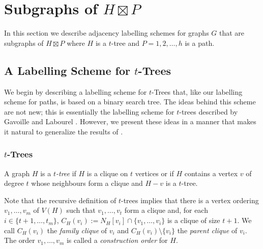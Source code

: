 \documentclass[kpfonts]{patmorin}
\begin{document}
\section{Subgraphs of $H\boxtimes P$}

In this section we describe adjacency labelling schemes for graphs $G$ that are subgraphs of $H\boxtimes P$ where $H$ is a $t$-tree and $P=1,2,\ldots,h$ is a path.  


\subsection{A Labelling Scheme for $t$-Trees}

We begin by describing a labelling scheme for $t$-Trees that, like our labelling scheme for paths, is based on a binary search tree.  The ideas behind this scheme are not new; this is essentially the labelling scheme for $t$-trees described by Gavoille and Labourel \cite{gavoille.labourel:shorter}.  However, we present these ideas in a manner that makes it natural to generalize the results of .

\subsubsection{$t$-Trees}

A graph $H$ is a \emph{$t$-tree} if $H$ is a clique on $t$ vertices or if $H$ contains a vertex $v$ of degree $t$ whose neighbours form a clique and $H-v$ is a $t$-tree.  

Note that the recursive definition of $t$-trees implies that there is a vertex ordering $v_1,\ldots,v_{m}$ of $V(H)$ such that $v_1,\ldots,v_t$ form a clique and, for each $i\in\{t+1,\ldots,t_m\}$, $C_H(v_i):=N_H[v_i]\cap \{v_1,\ldots,v_{i}\}$ is a clique of size $t+1$.  We call $C_H(v_i)$ the \emph{family clique} of $v_i$ and $C_H(v_i)\setminus\{v_i\}$ the \emph{parent clique} of $v_i$.  The order $v_1,\ldots,v_m$ is called a \emph{construction order} for $H$.
\end{document}
